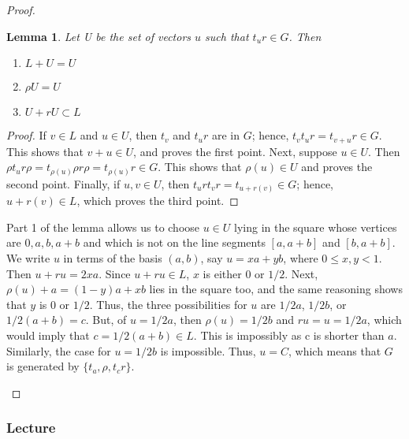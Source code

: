 \documentclass[12pt]{article}
\newtheorem{lem}[thm]{Lemma}  %
\theoremstyle{definition}
\theoremstyle{remark}
\numberwithin{equation}{section}
\begin{document}
\begin{proof}
\begin{enumerate}
                \begin{lem}
                        Let U be the set of vectors $u$ such that $t_ur \in G$. Then \begin{enumerate}
                                \item $L + U = U$
                                \item $\rho U = U$
                                \item $U + rU \subset L$
                        \end{enumerate}
                \end{lem}
                        \begin{proof}
                                If $v \in L$ and $u \in U$, then $t_v$ and $t_ur$ are in $G$; hence, $t_vt_ur = t_{v+u}r \in G$. This shows that $v + u \in U$, and proves the first point. Next, suppose $u \in U$. Then $\rho t_u r \rho = t_{\rho(u)}\rho r\rho = t_{\rho(u)} r \in G$. This shows that $\rho(u) \in U$ and proves the second point. Finally, if $u,v \in U$, then $t_urt_vr = t_{u+r(v)} \in G$; hence, $u + r(v) \in L$, which proves the third point.
                        \end{proof}

                        Part 1 of the lemma allows us to choose $u \in U$ lying in the square whose vertices are $0,a,b,a+b$ and which is not on the line segments $[a,a+b]$ and $[b,a+b]$. We write $u$ in terms of the basis $(a,b)$, say $u = xa + yb$, where $0\leq x,y < 1$. Then $u+ru = 2xa$. Since $u + ru \in L$, $x$ is either $0$ or $1/2$. Next, $\rho(u) + a = (1-y)a+ xb$ lies in the square too, and the same reasoning shows that $y$ is $0$ or $1/2$. Thus, the three possibilities for $u$ are $1/2a$, $1/2b$, or $1/2(a+b)=c$. But, of $u = 1/2a$, then $\rho(u) = 1/2b$ and $ru = u = 1/2a$, which would imply that $c = 1/2(a+b) \in L$. This is impossibly as c is shorter than $a$. Similarly, the case for $u = 1/2b$ is impossible. Thus, $u = C$, which means that $G$ is generated by $\{t_a,\rho,t_cr\}$.
        \end{enumerate}
\end{proof}

\vspace{15pt}



\subsubsection{Lecture}
\end{document}
